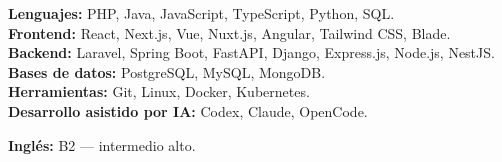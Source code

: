 \textbf{Lenguajes:} PHP, Java, JavaScript, TypeScript, Python, SQL.\\
\textbf{Frontend:} React, Next.js, Vue, Nuxt.js, Angular, Tailwind CSS, Blade.\\
\textbf{Backend:} Laravel, Spring Boot, FastAPI, Django, Express.js, Node.js, NestJS.\\
\textbf{Bases de datos:} PostgreSQL, MySQL, MongoDB.\\
\textbf{Herramientas:} Git, Linux, Docker, Kubernetes.\\
\textbf{Desarrollo asistido por IA:} Codex, Claude, OpenCode.

\textbf{Inglés:} B2 --- intermedio alto.

